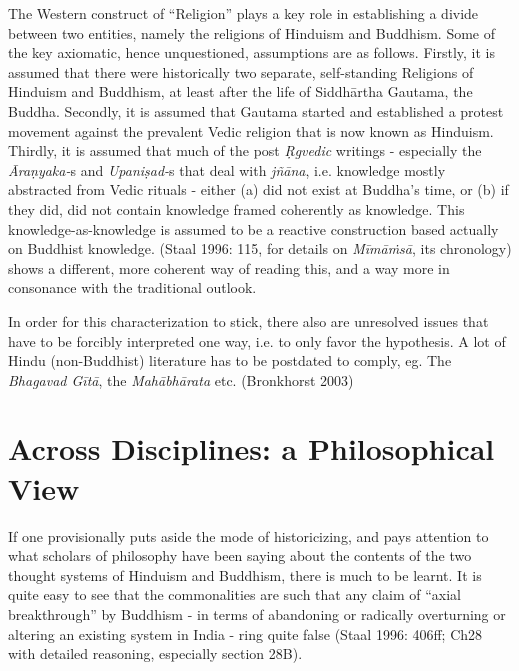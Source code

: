 The Western construct of ``Religion” plays a key role in establishing a divide between two entities, namely the religions of Hinduism and Buddhism. Some of the key axiomatic, hence unquestioned, assumptions are as follows. Firstly, it is assumed that there were historically two separate, self-standing Religions of Hinduism and Buddhism, at least after the life of Siddhārtha Gautama, the Buddha. Secondly, it is assumed that Gautama started and established a protest movement against the prevalent Vedic religion that is now known as Hinduism. Thirdly, it is assumed that much of the post \textit{Ṛgvedic} writings - especially the \textit{Āraṇyaka-}s and \textit{Upaniṣad-}s that deal with \textit{jñāna}, i.e. knowledge mostly abstracted from Vedic rituals - either (a) did not exist at Buddha’s time, or (b) if they did, did not contain knowledge framed coherently as knowledge. This knowledge-as-knowledge is assumed to be a reactive construction based actually on Buddhist knowledge. (Staal 1996: 115, for details on \textit{Mīmāṁsā}, its chronology) shows a different, more coherent way of reading this, and a way more in consonance with the traditional outlook.

In order for this characterization to stick, there also are unresolved issues that have to be forcibly interpreted one way, i.e. to only favor the hypothesis. A lot of Hindu (non-Buddhist) literature has to be postdated to comply, eg. The \textit{Bhagavad Gītā}, the \textit{Mahābhārata} etc. (Bronkhorst 2003)


\section*{Across Disciplines: a Philosophical View}

If one provisionally puts aside the mode of historicizing, and pays attention to what scholars of philosophy have been saying about the contents of the two thought systems of Hinduism and Buddhism, there is much to be learnt. It is quite easy to see that the commonalities are such that any claim of “axial breakthrough” by Buddhism - in terms of abandoning or radically overturning or altering an existing system in India - ring quite false (Staal 1996: 406ff; Ch28 with detailed reasoning, especially section 28B).

